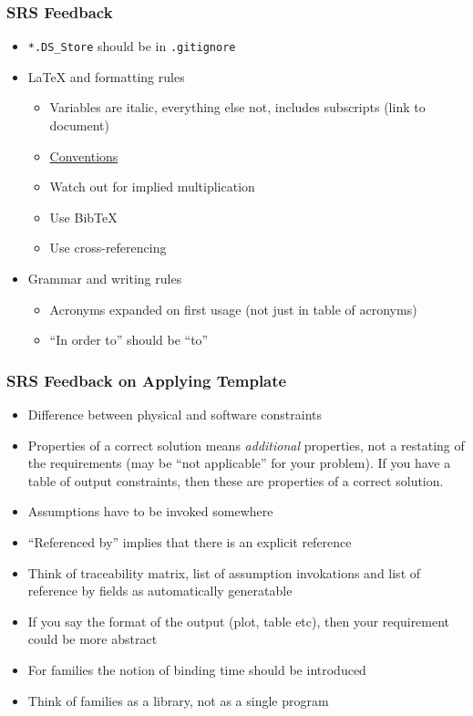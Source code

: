 \documentclass[t,12pt,numbers,fleqn]{beamer}
\begin{document}
\begin{frame}

\frametitle{SRS Feedback}

\begin{itemize}
\item \texttt{*.DS\_Store} should be in \texttt{.gitignore}
\item \LaTeX{} and formatting rules
\begin{itemize}
\item Variables are italic, everything else not, includes subscripts (link to
  document)
\bi
\item \href{https://physics.nist.gov/cuu/pdf/typefaces.pdf}{Conventions}
\item Watch out for implied multiplication
\ei
\item Use BibTeX
\item Use cross-referencing
\end{itemize}
\item Grammar and writing rules
\begin{itemize}
\item Acronyms expanded on first usage (not just in table of acronyms)
\item ``In order to'' should be ``to''
\end{itemize}
\end{itemize}
\end{frame}


\begin{frame}

\frametitle{SRS Feedback on Applying Template}

\begin{itemize}
\item Difference between physical and software constraints
\item Properties of a correct solution means \emph{additional} properties, not
  a restating of the requirements (may be ``not applicable'' for your problem).
  If you have a table of output constraints, then these are properties of a
  correct solution.
\item Assumptions have to be invoked somewhere
\item ``Referenced by'' implies that there is an explicit reference
\item Think of traceability matrix, list of assumption invokations and list of
  reference by fields as automatically generatable
\item If you say the format of the output (plot, table etc), then your
  requirement could be more abstract
\item For families the notion of binding time should be introduced
\item Think of families as a library, not as a single program
\end{itemize}
\end{frame}
\end{document}
